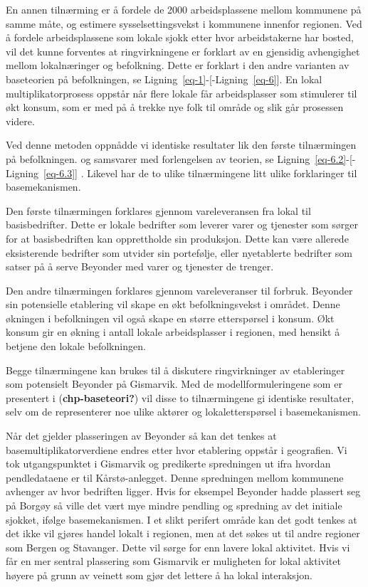 \documentclass[
]{article}
\begin{document}
En annen tilnærming er å fordele de 2000 arbeidsplassene mellom
kommunene på samme måte, og estimere sysselsettingsvekst i kommunene
innenfor regionen. Ved å fordele arbeidsplassene som lokale sjokk etter
hvor arbeidstakerne har bosted, vil det kunne forventes at
ringvirkningene er forklart av en gjensidig avhengighet mellom
lokalnæringer og befolkning. Dette er forklart i den andre varianten av
baseteorien på befolkningen, se
Ligning~\ref{eq-1}-{[}-Ligning~\ref{eq-6}{]}. En lokal
multiplikatorprosess oppstår når flere lokale får arbeidsplasser som
stimulerer til økt konsum, som er med på å trekke nye folk til område og
slik går prosessen videre.

Ved denne metoden oppnådde vi identiske resultater lik den første
tilnærmingen på befolkningen. og samsvarer med forlengelsen av teorien,
se Ligning~\ref{eq-6.2}-{[}-Ligning~\ref{eq-6.3}{]} . Likevel har de to
ulike tilnærmingene litt ulike forklaringer til basemekanismen.

Den første tilnærmingen forklares gjennom vareleveransen fra lokal til
basisbedrifter. Dette er lokale bedrifter som leverer varer og tjenester
som sørger for at basisbedriften kan opprettholde sin produksjon. Dette
kan være allerede eksisterende bedrifter som utvider sin portefølje,
eller nyetablerte bedrifter som satser på å serve Beyonder med varer og
tjenester de trenger.

Den andre tilnærmingen forklares gjennom vareleveranser til forbruk.
Beyonder sin potensielle etablering vil skape en økt befolkningsvekst i
området. Denne økningen i befolkningen vil også skape en større
etterspørsel i konsum. Økt konsum gir en økning i antall lokale
arbeidsplasser i regionen, med hensikt å betjene den lokale
befolkningen.

Begge tilnærmingene kan brukes til å diskutere ringvirkninger av
etableringer som potensielt Beyonder på Gismarvik. Med de
modellformuleringene som er presentert i (\textbf{chp-baseteori?}) vil
disse to tilnærmingene gi identiske resultater, selv om de representerer
noe ulike aktører og lokaletterspørsel i basemekanismen.

Når det gjelder plasseringen av Beyonder så kan det tenkes at
basemultiplikatorverdiene endres etter hvor etablering oppstår i
geografien. Vi tok utgangspunktet i Gismarvik og predikerte spredningen
ut ifra hvordan pendledataene er til Kårstø-anlegget. Denne spredningen
mellom kommunene avhenger av hvor bedriften ligger. Hvis for eksempel
Beyonder hadde plassert seg på Borgøy så ville det vært mye mindre
pendling og spredning av det initiale sjokket, ifølge basemekanismen. I
et slikt perifert område kan det godt tenkes at det ikke vil gjøres
handel lokalt i regionen, men at det søkes ut til andre regioner som
Bergen og Stavanger. Dette vil sørge for enn lavere lokal aktivitet.
Hvis vi får en mer sentral plassering som Gismarvik er muligheten for
lokal aktivitet høyere på grunn av veinett som gjør det lettere å ha
lokal interaksjon.
\end{document}

